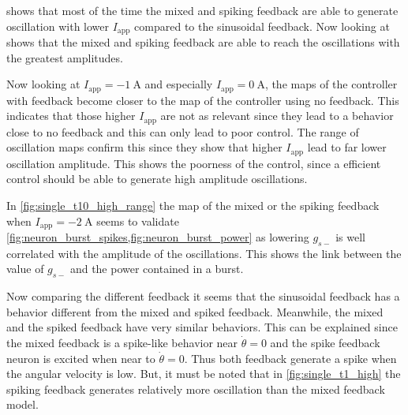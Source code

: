 
 shows that most of the time the mixed and spiking feedback are able to generate oscillation with lower $I_\text{app}$ compared to the sinusoidal feedback. 
Now looking at  shows that the mixed and spiking feedback are able to reach the oscillations with the greatest amplitudes. 

Now looking at $I_\text{app} = \qty{-1}{\ampere}$ and especially $I_\text{app} = \qty{0}{\ampere}$, the maps of the controller with feedback become closer to the map of the controller using no feedback. 
This indicates that those higher $I_\text{app}$ are not as relevant since they lead to a behavior close to no feedback and this can only lead to poor control. 
The range of oscillation maps confirm this since they show that higher $I_\text{app}$ lead to far lower oscillation amplitude. 
This shows the poorness of the control, since a efficient control should be able to generate high amplitude oscillations.

In \cref{fig:single_t10_high_range} the  map of the mixed or the spiking feedback when $I_\text{app}=\qty{-2}{\ampere}$ seems to validate \cref{fig:neuron_burst_spikes,fig:neuron_burst_power} as lowering $g_{s-}$ is well correlated with the amplitude of the oscillations. This shows the link between the value of $g_{s-}$ and the power contained in a burst.

Now comparing the different feedback it seems that the sinusoidal feedback has a behavior different from the mixed and spiked feedback. 
Meanwhile, the mixed and the spiked feedback have very similar behaviors. 
This can be explained since the mixed feedback is a spike-like behavior near $\dot{\theta}=0$ and the spike feedback neuron is excited when near to $\dot{\theta}=0$. 
Thus both feedback generate a spike when the angular velocity is low. 
But, it must be noted that in \cref{fig:single_t1_high} the spiking feedback generates relatively more oscillation than the mixed feedback model.

